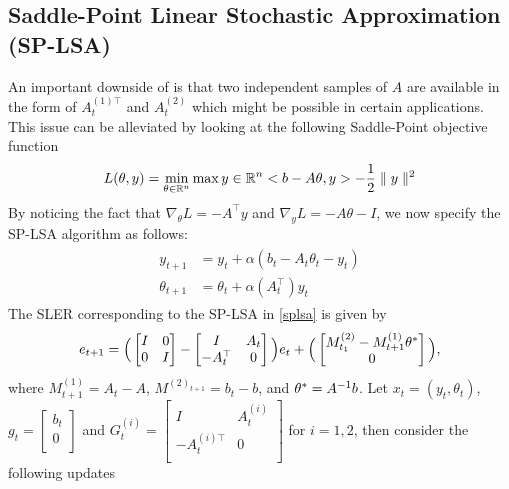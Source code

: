 \subsection{Saddle-Point Linear Stochastic Approximation (SP-LSA)}
An important downside of  is that two independent samples of $A$ are available in the form of $A^{(1)\top}_t$ and $A^{(2)}_t$ which might be possible in certain applications. This issue can be alleviated by looking at the following Saddle-Point objective function
\begin{align}
L(\theta,y)=\min_{\theta\in \mathbb{R}^n}\max{y\in \mathbb{R}^n}<b-A\theta,y>-\frac{1}{2}\parallel y\parallel ^2
\end{align}
By noticing the fact that $\nabla_\theta L =-A^\top y$ and $\nabla_{y}L=-A\theta-I$, we now specify the SP-LSA algorithm as follows:
\begin{align}\label{splsa}
\begin{split}
y_{t+1}&=y_t+\alpha (b_t-A_t\theta_t-y_t)\\
\theta_{t+1}&=\theta_t+\alpha(A_t^\top)y_t
\end{split}
\end{align}
The SLER corresponding to the SP-LSA in \eqref{splsa} is given by
\begin{align}
e_{t+1}=\Big(\begin{bmatrix} I & 0 \\ 0 &I\\\end{bmatrix} -\begin{bmatrix} I & A_t \\ -A_t^\top &0\\\end{bmatrix}\Big)e_t+\Big(\begin{bmatrix} M^{(2)}_{t_1}-M^{(1)}_{t+1}\theta^*  \\ 0\\\end{bmatrix}\Big),
\end{align}
where $M^{(1)}_{t+1}=A_t-A$, $M^{(2)_{t+1}}=b_t-b$,  and $\theta^*=A^{-1}b$.
Let $x_t=(y_t,\theta_t)$, $g_t=\begin{bmatrix} b_t\\ 0\\\end{bmatrix}$ and $G^{(i)}_t=\begin{bmatrix} I & A^{(i)}_t \\ -A^{(i)\top}_t &0\\\end{bmatrix}$ for $i=1,2$, then consider the following updates
